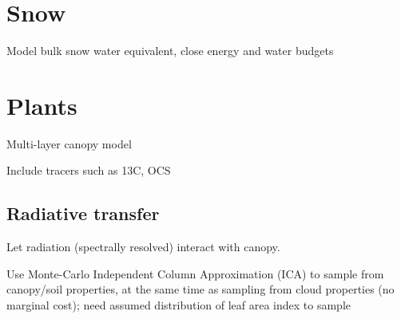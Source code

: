 \documentclass{article}
\begin{document}
\section{Snow}

Model bulk snow water equivalent, close energy and water budgets

\section{Plants}

Multi-layer canopy model

Include tracers such as 13C, OCS

\subsection{Radiative transfer}

Let radiation (spectrally resolved) interact with canopy.

Use Monte-Carlo Independent Column Approximation (ICA) to sample from canopy/soil properties, at the same time as sampling from cloud properties (no marginal cost); need assumed distribution of leaf area index to sample



\end{document}
